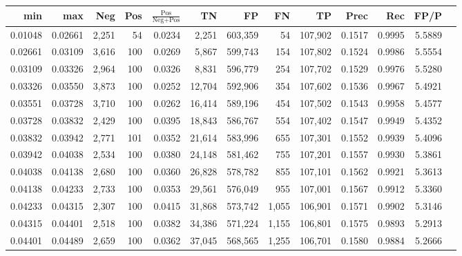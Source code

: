 \begin{tabular}{rrrrrrrrrrrrr}
\toprule
    min &     max &   Neg & Pos & $\frac{\text{Pos}}{\text{Neg}+\text{Pos}}$ &      TN &      FP &      FN &      TP &   Prec &    Rec &   FP/P \\
\midrule
0.01048 & 0.02661 & 2,251 &  54 &                                     0.0234 &   2,251 & 603,359 &      54 & 107,902 & 0.1517 & 0.9995 & 5.5889 \\
0.02661 & 0.03109 & 3,616 & 100 &                                     0.0269 &   5,867 & 599,743 &     154 & 107,802 & 0.1524 & 0.9986 & 5.5554 \\
0.03109 & 0.03326 & 2,964 & 100 &                                     0.0326 &   8,831 & 596,779 &     254 & 107,702 & 0.1529 & 0.9976 & 5.5280 \\
0.03326 & 0.03550 & 3,873 & 100 &                                     0.0252 &  12,704 & 592,906 &     354 & 107,602 & 0.1536 & 0.9967 & 5.4921 \\
0.03551 & 0.03728 & 3,710 & 100 &                                     0.0262 &  16,414 & 589,196 &     454 & 107,502 & 0.1543 & 0.9958 & 5.4577 \\
0.03728 & 0.03832 & 2,429 & 100 &                                     0.0395 &  18,843 & 586,767 &     554 & 107,402 & 0.1547 & 0.9949 & 5.4352 \\
0.03832 & 0.03942 & 2,771 & 101 &                                     0.0352 &  21,614 & 583,996 &     655 & 107,301 & 0.1552 & 0.9939 & 5.4096 \\
0.03942 & 0.04038 & 2,534 & 100 &                                     0.0380 &  24,148 & 581,462 &     755 & 107,201 & 0.1557 & 0.9930 & 5.3861 \\
0.04038 & 0.04138 & 2,680 & 100 &                                     0.0360 &  26,828 & 578,782 &     855 & 107,101 & 0.1562 & 0.9921 & 5.3613 \\
0.04138 & 0.04233 & 2,733 & 100 &                                     0.0353 &  29,561 & 576,049 &     955 & 107,001 & 0.1567 & 0.9912 & 5.3360 \\
0.04233 & 0.04315 & 2,307 & 100 &                                     0.0415 &  31,868 & 573,742 &   1,055 & 106,901 & 0.1571 & 0.9902 & 5.3146 \\
0.04315 & 0.04401 & 2,518 & 100 &                                     0.0382 &  34,386 & 571,224 &   1,155 & 106,801 & 0.1575 & 0.9893 & 5.2913 \\
0.04401 & 0.04489 & 2,659 & 100 &                                     0.0362 &  37,045 & 568,565 &   1,255 & 106,701 & 0.1580 & 0.9884 & 5.2666 \\

\end{tabular}
